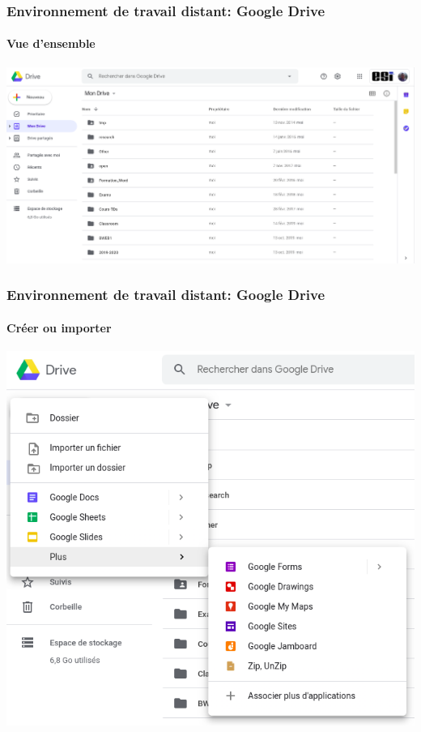 \documentclass{beamer}
\begin{document}
\begin{frame}
\frametitle{Environnement de travail distant: Google Drive}
\framesubtitle{Vue d'ensemble}

\begin{center}
	\includegraphics[width=
	\textwidth]{../img/Bweb01-environnement/drive.png}
\end{center}

\end{frame}

\begin{frame}
\frametitle{Environnement de travail distant: Google Drive}
\framesubtitle{Créer ou importer}

\begin{center}
	\includegraphics[height=
	.8\textheight]{../img/Bweb01-environnement/drive-new.png}
\end{center}

\end{frame}
\end{document}
